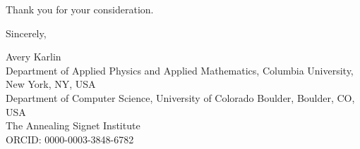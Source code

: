\documentclass[11pt]{article}
\begin{document}
Thank you for your consideration.

\medskip
\noindent Sincerely,

\medskip
\noindent Avery Karlin \\
Department of Applied Physics and Applied Mathematics, Columbia University, New
York, NY, USA \\
Department of Computer Science, University of Colorado Boulder, Boulder, CO, USA \\
The Annealing Signet Institute \\
ORCID: 0000-0003-3848-6782
\end{document}
